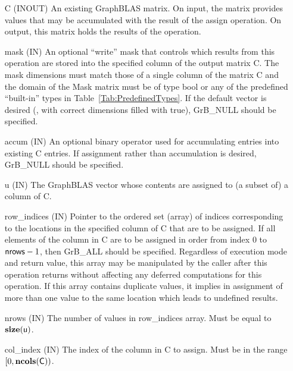 \begin{itemize}[leftmargin=1.1in]
    \item[{\sf C}]    ({\sf INOUT}) An existing GraphBLAS matrix.  On input,
    the matrix provides values that may be accumulated with the result of the
    assign operation.  On output, this matrix holds the results of the
    operation.

    \item[{\sf mask}] ({\sf IN}) An optional ``write'' mask that controls which
    results from this operation are stored into the specified column of the output matrix {\sf C}. The 
    mask dimensions must match those of a single column of the matrix {\sf C} and the domain of the
    {\sf Mask} matrix must be of type {\sf bool} or any of the predefined 
    ``built-in'' types in Table~\ref{Tab:PredefinedTypes}.  If the default
    vector is desired (\ie, with correct dimensions filled with {\sf true}), 
    {\sf GrB\_NULL} should be specified.

    \item[{\sf accum}] ({\sf IN}) An optional binary operator used for accumulating
    entries into existing {\sf C} entries. If assignment rather than accumulation is
    desired, {\sf GrB\_NULL} should be specified.

    \item[{\sf u}]    ({\sf IN}) The GraphBLAS vector whose contents are 
    assigned to (a subset of) a column of {\sf C}.

    \item[{\sf row\_indices}]  ({\sf IN}) Pointer to the ordered set (array) of 
    indices corresponding to the locations in the specified column of {\sf C} 
    that are to be assigned.  If all elements of the column in {\sf C} are to be 
    assigned in order from index $0$ to ${\sf nrows} - 1$, then {\sf GrB\_ALL} should be 
    specified.  Regardless of execution mode and return value, this array may be
    manipulated by the caller after this operation returns without affecting any 
    deferred computations for this operation.
    If this array contains duplicate values, it implies in assignment of more 
    than one value to the same location which leads to undefined results.
    
    \item[{\sf nrows}] ({\sf IN}) The number of values in {\sf row\_indices} array.
    Must be equal to $\bold{size}({\sf u})$.
    
    \item[{\sf col\_index}]  ({\sf IN}) The index of the column in {\sf C} to 
    assign. Must be in the range $[0, \bold{ncols}({\sf C}))$.


\end{itemize}
